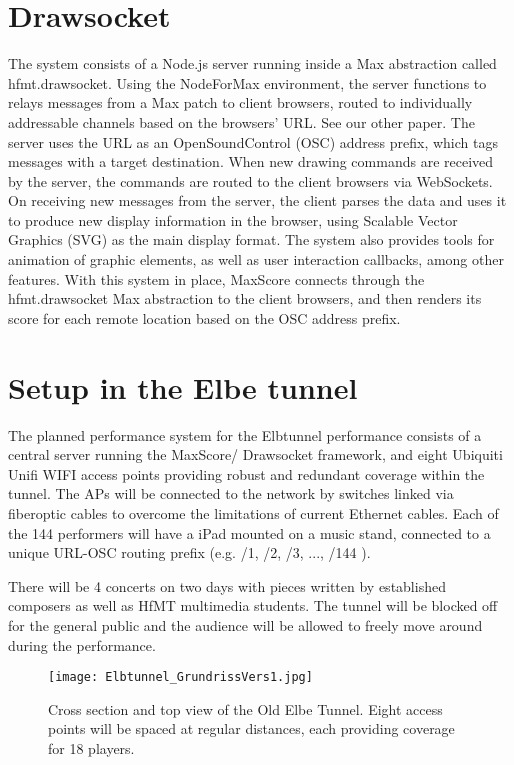 \section{Drawsocket}
The \drawsocket system consists of a Node.js server running inside a Max abstraction called hfmt.drawsocket.
Using the NodeForMax environment, the server functions to relays messages from a Max patch to client browsers, routed to individually addressable channels based on the browsers' URL. {\color{red} See our other paper}.
The server uses the URL as an OpenSoundControl (OSC) address prefix, which tags messages with a target destination.
When new drawing commands are received by the server, the commands are routed to the client browsers via WebSockets.
On receiving new messages from the server, the client parses the data and uses it to produce new display information in the browser, using Scalable Vector Graphics (SVG) as the main display format.
The system also provides tools for animation of graphic elements, as well as user interaction callbacks, among other features.
With this system in place, MaxScore connects through the hfmt.drawsocket Max abstraction to the client browsers, and then renders its score for each remote location based on the OSC address prefix.








\section{Setup in the Elbe tunnel}
The planned performance system for the Elbtunnel performance consists of a central server running the MaxScore/ Drawsocket framework, and eight Ubiquiti Unifi WIFI access points providing robust and redundant coverage within the tunnel. The APs will be connected to the network by switches linked via fiberoptic cables to overcome the limitations of current Ethernet cables.
Each of the 144 performers will have a iPad mounted on a music stand, connected to a unique URL-OSC routing prefix (e.g. {/1}, {/2}, {/3}, ..., {/144} ). 

There will be 4 concerts on two days with pieces written by established composers as well as HfMT multimedia students. The tunnel will be blocked off for the general public and the audience will be allowed to freely move around during the performance.

\begin{figure*}[h]
    \centering
    \begin{minipage}{1.\textwidth}
        \centering
        \texttt{[image: Elbtunnel\_GrundrissVers1.jpg]} 
       	\caption{Cross section and top view of the Old Elbe Tunnel. Eight access points will be spaced at regular distances, each providing coverage for 18 players.
\label{fig:Elbtunnel_GrundrissVers1.jpg}}
    \end{minipage}
\end{figure*}


